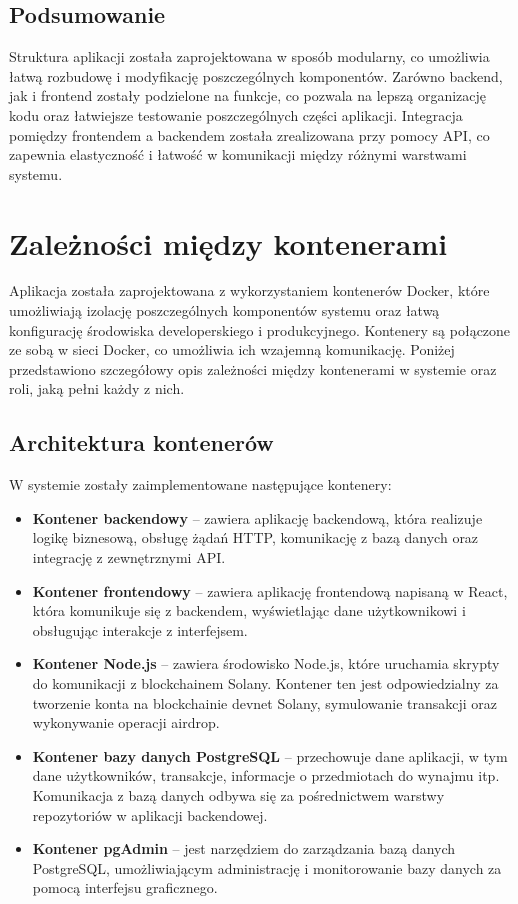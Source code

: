\subsection{Podsumowanie}

Struktura aplikacji została zaprojektowana w sposób modularny, co umożliwia łatwą rozbudowę i modyfikację poszczególnych komponentów. Zarówno backend, jak i frontend zostały podzielone na funkcje, co pozwala na lepszą organizację kodu oraz łatwiejsze testowanie poszczególnych części aplikacji. Integracja pomiędzy frontendem a backendem została zrealizowana przy pomocy API, co zapewnia elastyczność i łatwość w komunikacji między różnymi warstwami systemu.


\section{Zależności między kontenerami}

Aplikacja została zaprojektowana z wykorzystaniem kontenerów Docker, które umożliwiają izolację poszczególnych komponentów systemu oraz łatwą konfigurację środowiska developerskiego i produkcyjnego. Kontenery są połączone ze sobą w sieci Docker, co umożliwia ich wzajemną komunikację. Poniżej przedstawiono szczegółowy opis zależności między kontenerami w systemie oraz roli, jaką pełni każdy z nich.

\subsection{Architektura kontenerów}

W systemie zostały zaimplementowane następujące kontenery:

\begin{itemize}
    \item \textbf{Kontener backendowy} – zawiera aplikację backendową, która realizuje logikę biznesową, obsługę żądań HTTP, komunikację z bazą danych oraz integrację z zewnętrznymi API.
    \item \textbf{Kontener frontendowy} – zawiera aplikację frontendową napisaną w React, która komunikuje się z backendem, wyświetlając dane użytkownikowi i obsługując interakcje z interfejsem.
    \item \textbf{Kontener Node.js} – zawiera środowisko Node.js, które uruchamia skrypty do komunikacji z blockchainem Solany. Kontener ten jest odpowiedzialny za tworzenie konta na blockchainie devnet Solany, symulowanie transakcji oraz wykonywanie operacji airdrop.
    \item \textbf{Kontener bazy danych PostgreSQL} – przechowuje dane aplikacji, w tym dane użytkowników, transakcje, informacje o przedmiotach do wynajmu itp. Komunikacja z bazą danych odbywa się za pośrednictwem warstwy repozytoriów w aplikacji backendowej.
    \item \textbf{Kontener pgAdmin} – jest narzędziem do zarządzania bazą danych PostgreSQL, umożliwiającym administrację i monitorowanie bazy danych za pomocą interfejsu graficznego.
\end{itemize}

